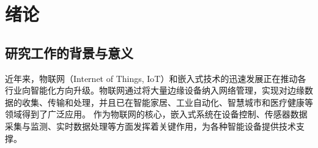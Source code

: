 \documentclass[master, vlined, review]{DissertUESTC}
\begin{document}
	
	
	
	
	\chapter{绪论}
	\section{研究工作的背景与意义}
	
	近年来，物联网（Internet of Things, IoT）和嵌入式技术的迅速发展正在推动各行业向智能化方向升级。物联网通过将大量边缘设备纳入网络管理，实现对边缘数据的收集、传输和处理，并且已在智能家居、工业自动化、智慧城市和医疗健康等领域得到了广泛应用。
	作为物联网的核心，嵌入式系统在设备控制、传感器数据采集与监测、实时数据处理等方面发挥着关键作用，为各种智能设备提供技术支撑。
	
\end{document}
